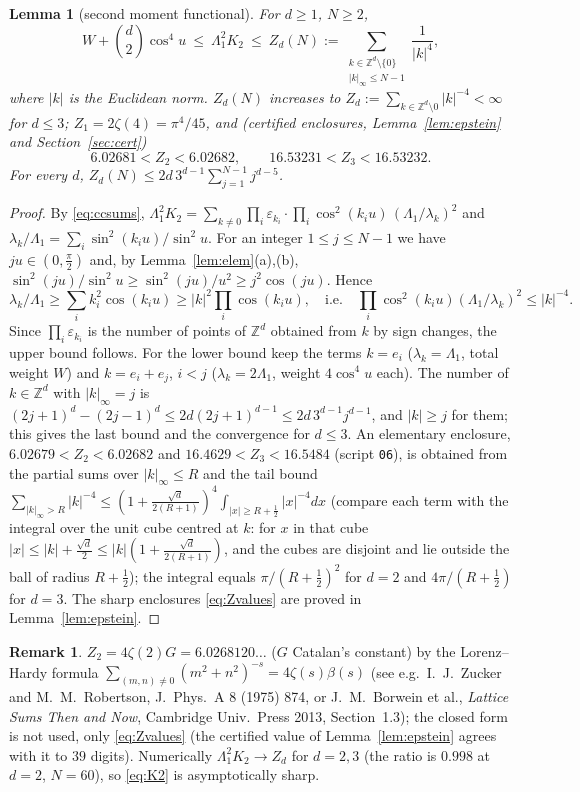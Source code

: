\documentclass[11pt,a4paper]{article}
\newcommand{\Z}{\mathbb Z}
\theoremstyle{plain}
\newtheorem{lemma}[theorem]{Lemma}
\theoremstyle{definition}
\newtheorem{remark}[theorem]{Remark}
\numberwithin{equation}{section}
\begin{document}
\begin{lemma}[second moment functional]\label{lem:K2}
For $d\ge1$, $N\ge2$,
\begin{equation}\label{eq:K2}
W+\binom d2\cos^4u\ \le\ \Lambda_1^2K_2\ \le\ Z_d(N):=\sum_{\substack{k\in\Z^d\setminus\{0\}\\ |k|_\infty\le N-1}}\frac{1}{|k|^4},
\end{equation}
where $|k|$ is the Euclidean norm. $Z_d(N)$ increases to $Z_d:=\sum_{k\in\Z^d\setminus0}|k|^{-4}<\infty$ for $d\le3$; $Z_1=2\zeta(4)=\pi^4/45$, and (certified enclosures, Lemma~\ref{lem:epstein} and Section~\ref{sec:cert})
\begin{equation}\label{eq:Zvalues}
6.02681<Z_2<6.02682,\qquad 16.53231<Z_3<16.53232 .
\end{equation}
For every $d$, $Z_d(N)\le2d\,3^{d-1}\sum_{j=1}^{N-1}j^{d-5}$.
\end{lemma}
\begin{proof}
By \eqref{eq:ccsums}, $\Lambda_1^2K_2=\sum_{k\ne0}\prod_i\varepsilon_{k_i}\cdot\prod_i\cos^2(k_iu)\,(\Lambda_1/\lambda_k)^2$ and $\lambda_k/\Lambda_1=\sum_i\sin^2(k_iu)/\sin^2u$. For an integer $1\le j\le N-1$ we have $ju\in(0,\frac\pi2)$ and, by Lemma~\ref{lem:elem}(a),(b), $\sin^2(ju)/\sin^2u\ge\sin^2(ju)/u^2\ge j^2\cos(ju)$. Hence
\[\lambda_k/\Lambda_1\ge\sum_ik_i^2\cos(k_iu)\ge|k|^2\prod_i\cos(k_iu),\quad\text{i.e.}\quad\prod_i\cos^2(k_iu)(\Lambda_1/\lambda_k)^2\le|k|^{-4}.\] Since $\prod_i\varepsilon_{k_i}$ is the number of points of $\Z^d$ obtained from $k$ by sign changes, the upper bound follows. For the lower bound keep the terms $k=e_i$ ($\lambda_k=\Lambda_1$, total weight $W$) and $k=e_i+e_j$, $i<j$ ($\lambda_k=2\Lambda_1$, weight $4\cos^4u$ each).
The number of $k\in\Z^d$ with $|k|_\infty=j$ is $(2j+1)^d-(2j-1)^d\le2d(2j+1)^{d-1}\le2d\,3^{d-1}j^{d-1}$, and $|k|\ge j$ for them; this gives the last bound and the convergence for $d\le3$. An elementary enclosure, $6.02679<Z_2<6.02682$ and $16.4629<Z_3<16.5484$ (script \texttt{06}), is obtained from the partial sums over $|k|_\infty\le R$ and the tail bound $\sum_{|k|_\infty>R}|k|^{-4}\le(1+\frac{\sqrt d}{2(R+1)})^4\int_{|x|\ge R+\frac12}|x|^{-4}dx$ (compare each term with the integral over the unit cube centred at $k$: for $x$ in that cube $|x|\le|k|+\frac{\sqrt d}2\le|k|(1+\frac{\sqrt d}{2(R+1)})$, and the cubes are disjoint and lie outside the ball of radius $R+\frac12$); the integral equals $\pi/(R+\frac12)^2$ for $d=2$ and $4\pi/(R+\frac12)$ for $d=3$. The sharp enclosures \eqref{eq:Zvalues} are proved in Lemma~\ref{lem:epstein}.
\end{proof}
\begin{remark}
$Z_2=4\zeta(2)G=6.0268120\ldots$ ($G$ Catalan's constant) by the Lorenz--Hardy formula $\sum_{(m,n)\ne0}(m^2+n^2)^{-s}=4\zeta(s)\beta(s)$ (see e.g.\ I.~J.~Zucker and M.~M.~Robertson, J.~Phys.~A 8 (1975) 874, or J.~M.~Borwein et al., \emph{Lattice Sums Then and Now}, Cambridge Univ.\ Press 2013, Section~1.3); the closed form is not used, only \eqref{eq:Zvalues} (the certified value of Lemma~\ref{lem:epstein} agrees with it to $39$ digits). Numerically $\Lambda_1^2K_2\to Z_d$ for $d=2,3$ (the ratio is $0.998$ at $d=2$, $N=60$), so \eqref{eq:K2} is asymptotically sharp.
\end{remark}
\end{document}
